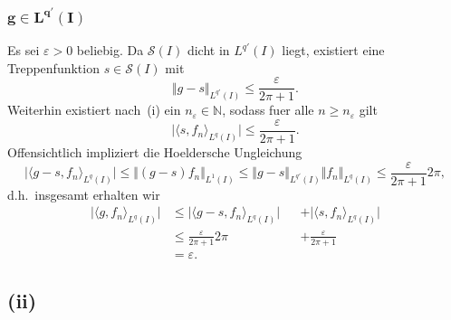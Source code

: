 \documentclass{article}
\begin{document}
\subsubsection*{$\bm{g \in L^{q'}(I)}$}

Es sei $\varepsilon > 0$ beliebig. Da $\mathcal{S}(I)$ dicht in $L^{q'}(I)$ liegt, existiert eine Treppenfunktion $s \in \mathcal{S}(I)$ mit
\begin{equation*}
  \Vert g - s \Vert_{L^{q'}(I)}
  \leq \frac{\varepsilon}{2 \pi + 1}.
\end{equation*}
Weiterhin existiert nach~(i) ein $n_\varepsilon \in \mathbb{N}$, sodass fuer alle $n \geq n_\varepsilon$ gilt
\begin{equation*}
  \vert \langle s, f_n \rangle_{L^q(I)} \vert
  \leq \frac{\varepsilon}{2 \pi + 1}.
\end{equation*}
Offensichtlich impliziert die Hoeldersche Ungleichung
\begin{equation*}
  \vert \langle g - s, f_n \rangle_{L^q(I)} \vert
  \leq \Vert (g-s) f_n \Vert_{L^1(I)}
  \leq \Vert g-s \Vert_{L^{q'}(I)} \Vert f_n \Vert_{L^q(I)}
  \leq \frac{\varepsilon}{2 \pi + 1} 2 \pi,
\end{equation*}
d.h.\ insgesamt erhalten wir
\begin{equation*}
  \begin{aligned}
    \vert \langle g, f_n \rangle_{L^q(I)} \vert
    &\leq \vert \langle g - s, f_n \rangle_{L^q(I)} \vert
    &&+ \vert \langle s, f_n \rangle_{L^q(I)} \vert \\
    &\leq \frac{\varepsilon}{2 \pi + 1} 2 \pi
    &&+ \frac{\varepsilon}{2 \pi + 1}\\
    &= \varepsilon.
  \end{aligned}
\end{equation*}

\subsection*{(ii)}
\end{document}
